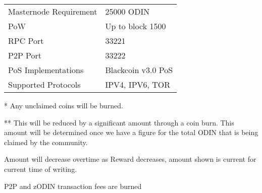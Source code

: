 \documentclass[12pt,letterpaper]{article}
\begin{document}
\begin{center}
\begin{adjustbox}{max width=\textwidth}
\begin{threeparttable}
\begin{tabular}{p{6.5cm} p{8cm}}
Masternode Requirement  & \num{25000} ODIN \\

PoW                     & Up to block 1500 \\

RPC Port                & 33221 \\

P2P Port                & 33222 \\

PoS Implementations     & Blackcoin v3.0 PoS \\

Supported Protocols     & IPV4, IPV6, TOR \\
\hline 
\end{tabular}
\begin{tablenotes}
   \item[*] Any unclaimed coins will be burned.
   \item[**] This will be reduced by a significant amount through a coin burn. This amount will be determined once we have a figure for the total ODIN that is being claimed by the community.
   \item[\dag] Amount will decrease overtime as Reward decreases, amount shown is current for current time of writing.
   \item[\dag\dag] P2P and zODIN transaction fees are burned
\end{tablenotes}
\end{threeparttable}
\end{adjustbox}
\end{center}
\renewcommand{\arraystretch}{1}

 
\end{document}

